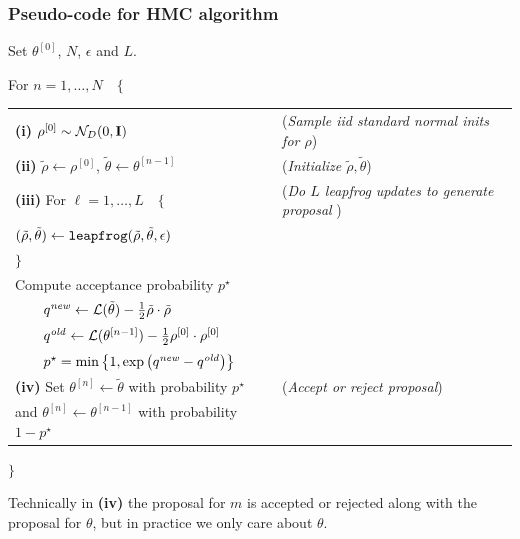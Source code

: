 \subsubsection{Pseudo-code for HMC algorithm}


\noindent Set $\theta^{[0]}$, $N$, $\epsilon$ and $L$.

\noindent For $n = 1, \dots, N \quad \{$ 

\begin{tabular}{ll}
{\bf (i)} $\rho^{[0]} \sim \mathcal{N}_D(0, \mathbf{I})$ & ({\it Sample iid standard normal inits for $\rho$}) \\

{\bf (ii)} $\tilde{\rho} \leftarrow \rho^{[0]}$, $\tilde{\theta} \leftarrow \theta^{[n-1]}$ &  ({\it Initialize $\tilde{\rho}, \tilde{\theta}$})\\

{\bf (iii)} For $\ell = 1, \dots, L \quad \{$  & ({\it Do $L$ leapfrog updates to generate proposal }) \\[-8pt]

\qquad $(\tilde{\rho}, \tilde{\theta}) \leftarrow {\tt leapfrog}(\tilde{\rho}, \tilde{\theta}, \epsilon)$ & \\[-8pt]
\quad $\}$ & \\

\quad Compute acceptance probability $p^\star$  & \\[-8pt]
$\qquad  q^{\it new} \leftarrow  \mathcal{L}(\tilde{\theta}) - \tfrac{1}{2} \tilde{\rho} \cdot \tilde{\rho} $ & \\[-8pt]
$ \qquad q^{\it old} \leftarrow   \mathcal{L}(\theta^{[n-1]} ) -  \tfrac{1}{2} \rho^{[0]} \cdot \rho^{[0]} $ & \\[-8pt]
$ \qquad p^\star = \min{\left\{1, \exp{\left( q^{\it new} - q^{\it old} \right)} \right\}} $& \\[3pt]

{\bf (iv)} Set $\theta^{[n]} \leftarrow \tilde{\theta}$ with probability $p^\star$  & ({\it Accept or reject proposal})\\
\qquad and $\theta^{[n]} \leftarrow \theta^{[n-1]}$ with probability $ 1 - p^\star$ & \\

\end{tabular}

\noindent $\}$

\noindent Technically in {\bf (iv)} the proposal for $m$ is accepted or rejected along with the proposal for $\theta$, but in practice we only care about $\theta$. 

